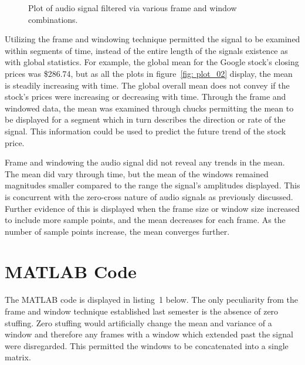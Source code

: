 \documentclass[11pt]{article}
\begin{document}
\begin{figure}[H] %
	\centering 
	\caption{Plot of audio signal filtered via various frame and window combinations.}
	\label{fig: plot_04} 
\end{figure}

Utilizing the frame and windowing technique permitted the signal to be examined within segments of time, instead of the entire length of the signals existence as with global statistics. For example, the global mean for the Google stock's closing prices was \$286.74, but as all the plots in figure~\ref{fig: plot_02} display, the mean is steadily increasing with time. The global overall mean does not convey if the stock's prices were increasing or decreasing with time. Through the frame and windowed data, the mean was examined through chucks permitting the mean to be displayed for a segment which in turn describes the direction or rate of the signal. This information could be used to predict the future trend of the stock price. 

Frame and windowing the audio signal did not reveal any trends in the mean. The mean did vary through time, but the mean of the windows remained magnitudes smaller compared to the range the signal's amplitudes displayed. This is concurrent with the zero-cross nature of audio signals as previously discussed. Further evidence of this is displayed when the frame size or window size increased to include more sample points, and the mean decreases for each frame. As the number of sample points increase, the mean converges further. 

\section{MATLAB Code} 
The MATLAB code is displayed in listing~1 below. The only peculiarity from the frame and window technique established last semester is the absence of zero stuffing. Zero stuffing would artificially change the mean and variance of a window and therefore any frames with a window which extended past the signal were disregarded. This permitted the windows to be concatenated into a single matrix.

\end{document}
